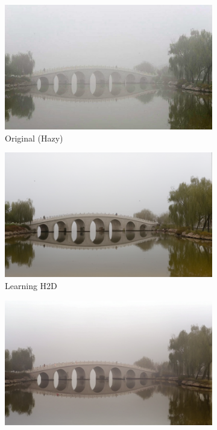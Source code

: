 \documentclass{article}
\begin{document}
\begin{figure}[t]
\begin{subfigure}[b]{0.32\textwidth}
    \centering
    \includegraphics[width=\textwidth]{examples_original/6.png}
    \caption{Original (Hazy)}
\end{subfigure}
\hfill
\begin{subfigure}[b]{0.32\textwidth}
    \centering
    \includegraphics[width=\textwidth]{examples_baseline/6.png}
    \caption{Learning H2D}
\end{subfigure}
\hfill
\begin{subfigure}[b]{0.32\textwidth}
    \centering
    \includegraphics[width=\textwidth]{examples_ours/6_isr_adaptive.png}

\end{subfigure}
\end{figure}
\end{document}
